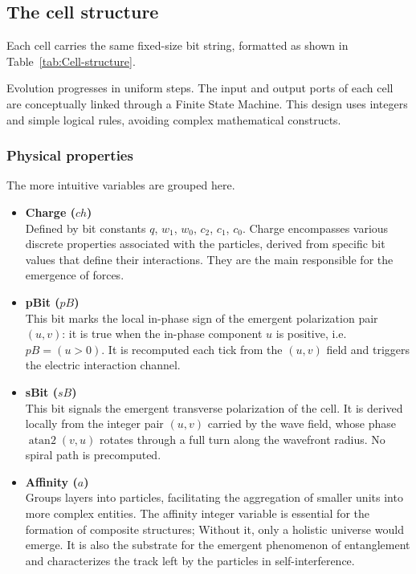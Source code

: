\documentclass{ijuc}
\begin{document}
\subsection{The cell structure \label{subsec:The-cell-structure}}

Each cell carries the same fixed-size bit string, formatted as shown in Table~\ref{tab:Cell-structure}.

Evolution progresses in uniform steps. 
The input and output ports of each cell are conceptually linked through a Finite State Machine. 
This design uses integers and simple logical rules, avoiding complex mathematical constructs.

\subsubsection{Physical properties}
The more intuitive variables are grouped here.
\begin{itemize}
	\item \textbf{Charge ($ch$)} \\
Defined by bit constants $q$, $w_{1}$, $w_{0}$, $c_{2}$, $c_{1}$, $c_{0}$.
Charge encompasses various discrete properties associated with the particles, derived from specific bit values that define their interactions. They are the main responsible for the emergence of forces.

	\item \textbf{pBit ($pB$)} \\
This bit marks the local in-phase sign of the emergent polarization pair $(u,v)$: it is true when the in-phase component $u$ is positive, i.e. $pB = (u>0)$. It is recomputed each tick from the $(u,v)$ field and triggers the electric interaction channel.

	\item \textbf{sBit ($sB$)} \\
This bit signals the emergent transverse polarization of the cell. It is derived locally from the integer pair $(u,v)$ carried by the wave field, whose phase $\operatorname{atan2}(v,u)$ rotates through a full turn along the wavefront radius. No spiral path is precomputed.

	\item \textbf{Affinity ($a$)} \\
Groups layers into particles, facilitating the aggregation of smaller units into more complex entities. The affinity integer variable is essential for the formation of composite structures; Without it, only a holistic universe would emerge. It is also the substrate for the emergent phenomenon of entanglement and characterizes the track left by the particles in self-interference.
\end{itemize}
\end{document}
